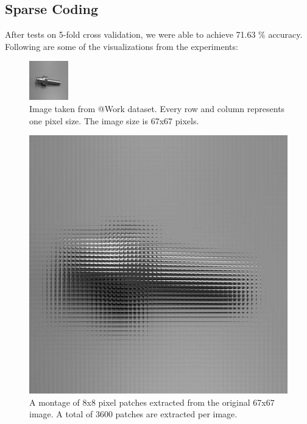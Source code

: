 \documentclass[	DIV=calc,%
				paper=a4,%
				fontsize=11pt,%
				twocolumn]{scrartcl}	 %
\begin{document}
\subsection*{Sparse Coding}
After tests on 5-fold cross validation, we were able to achieve 71.63 \% accuracy. Following are some of the visualizations from the experiments:

\begin{figure}[H]
    \centering
    \includegraphics[width=0.3\linewidth]{data/sc_data/sc_atwork_image.jpg}
    \caption{Image taken from @Work dataset. Every row and column represents one pixel size. The image size is 67x67 pixels.}
    \label{sc_atwork_image}
\end{figure}


\begin{figure}[H]
    \centering
    \includegraphics[width=0.6\linewidth]{data/sc_data/sc_atwork_patches_montage.jpg}
    \caption{A montage of 8x8 pixel patches extracted from the original 67x67 image. A total of 3600 patches are extracted per image.}
    \label{sc_atwork_patches_montage}
\end{figure}
\end{document}
